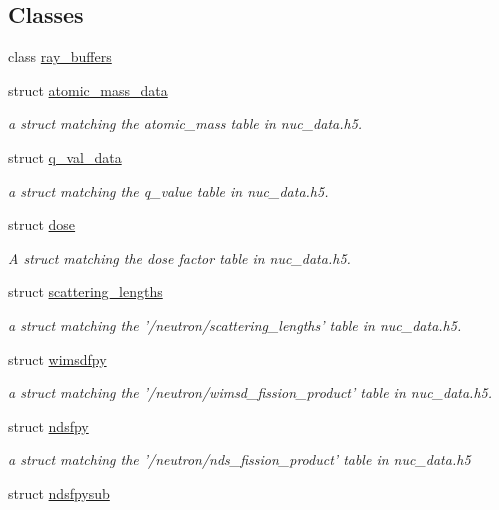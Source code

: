 \subsection*{Classes}
\begin{DoxyCompactItemize}
\item 
class \hyperlink{classpyne_1_1ray__buffers}{ray\-\_\-buffers}
\item 
struct \hyperlink{structpyne_1_1atomic__mass__data}{atomic\-\_\-mass\-\_\-data}
\begin{DoxyCompactList}\small\item\em a struct matching the atomic\-\_\-mass table in nuc\-\_\-data.\-h5. \end{DoxyCompactList}\item 
struct \hyperlink{structpyne_1_1q__val__data}{q\-\_\-val\-\_\-data}
\begin{DoxyCompactList}\small\item\em a struct matching the q\-\_\-value table in nuc\-\_\-data.\-h5. \end{DoxyCompactList}\item 
struct \hyperlink{structpyne_1_1dose}{dose}
\begin{DoxyCompactList}\small\item\em A struct matching the dose factor table in nuc\-\_\-data.\-h5. \end{DoxyCompactList}\item 
struct \hyperlink{structpyne_1_1scattering__lengths}{scattering\-\_\-lengths}
\begin{DoxyCompactList}\small\item\em a struct matching the '/neutron/scattering\-\_\-lengths' table in nuc\-\_\-data.\-h5. \end{DoxyCompactList}\item 
struct \hyperlink{structpyne_1_1wimsdfpy}{wimsdfpy}
\begin{DoxyCompactList}\small\item\em a struct matching the '/neutron/wimsd\-\_\-fission\-\_\-product' table in nuc\-\_\-data.\-h5. \end{DoxyCompactList}\item 
struct \hyperlink{structpyne_1_1ndsfpy}{ndsfpy}
\begin{DoxyCompactList}\small\item\em a struct matching the '/neutron/nds\-\_\-fission\-\_\-product' table in nuc\-\_\-data.\-h5 \end{DoxyCompactList}\item 
struct \hyperlink{structpyne_1_1ndsfpysub}{ndsfpysub}

\end{DoxyCompactItemize}
